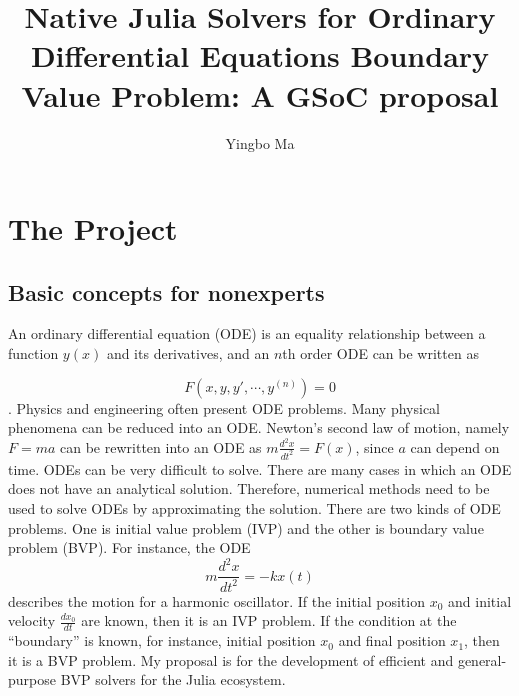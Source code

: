 \documentclass[a4paper,12pt,onecolumn]{article}
\author{Yingbo Ma}
\title{Native Julia Solvers for Ordinary Differential Equations Boundary Value Problem: A GSoC proposal}
\begin{document}
\maketitle
\maketitle
\tableofcontents



\section{The Project} %
\label{sec:the_project}

\subsection{Basic concepts for nonexperts} %
\label{sub:basic_concepts_for_nonexperts}
An ordinary differential equation (ODE)  is an equality relationship between a function $y(x)$
and its derivatives, and an $n$th order ODE can be written as

\[F(x, y, y', \cdots, y^{(n)}) = 0\].
Physics and engineering often present ODE problems. Many physical phenomena can be reduced into an ODE. Newton's second law of motion, namely $F=ma$ can be rewritten into an ODE as $m\frac{d^2x}{dt^2}
=F(x)$, since $a$ can depend on time. ODEs can be very difficult to solve. There are many cases in which an ODE does not have an analytical solution. Therefore, numerical methods need to be used to solve
ODEs by approximating the solution. There are two kinds of ODE problems. One is initial
value problem (IVP) and the other is boundary value problem (BVP). For instance, the ODE
\[m\frac{d^2x}{dt^2} = -kx(t)\]
describes the motion for a harmonic oscillator. If the initial position $x_0$ and initial velocity
$\frac{dx_0}{dt}$ are known, then it is an IVP problem. If the condition at the ``boundary'' is known,
for instance, initial position $x_0$ and final position $x_1$, then it is a BVP problem. My
proposal is for the development of efficient and general-purpose BVP solvers for the Julia
ecosystem.
\end{document}

